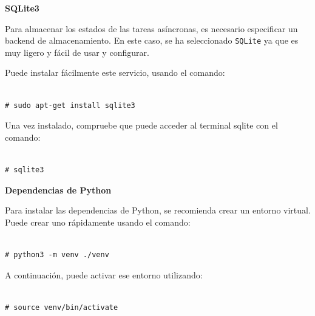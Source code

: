 \vspace{-1.4cm}

\textbf{SQLite3}

Para almacenar los estados de las tareas asíncronas, es necesario especificar un backend de almacenamiento. En este caso, se ha seleccionado \texttt{SQLite} ya que es muy ligero y fácil de usar y configurar.

Puede instalar fácilmente este servicio, usando el comando:

\vspace{-1.4cm}

\begin{verbatim}

# sudo apt-get install sqlite3

\end{verbatim}

\vspace{-1.4cm}

Una vez instalado, compruebe que puede acceder al terminal sqlite con el comando:

\vspace{-1.4cm}

\begin{verbatim}

# sqlite3

\end{verbatim}

\vspace{-1.4cm}

\textbf{Dependencias de Python}

Para instalar las dependencias de Python, se recomienda crear un entorno virtual. Puede crear uno rápidamente usando el comando:

\vspace{-1.4cm}

\begin{verbatim}

# python3 -m venv ./venv

\end{verbatim}

\vspace{-1.4cm}

A continuación, puede activar ese entorno utilizando:

\vspace{-1.4cm}

\begin{verbatim}

# source venv/bin/activate

\end{verbatim}

